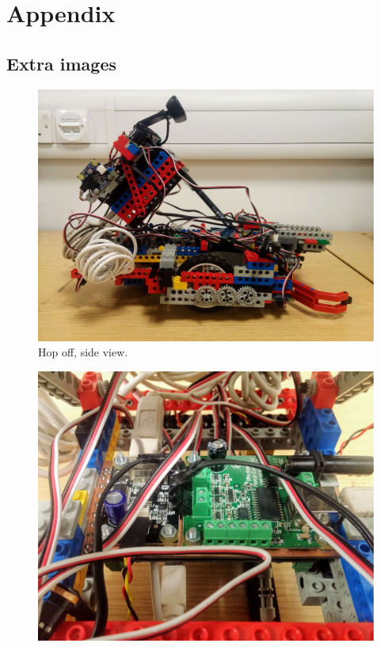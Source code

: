 \appendix

\section{Appendix}


\subsection{Extra images}

\begin{figure}[ht]
    \centering
    \includegraphics[width=0.7\linewidth]{res/robot-pics/top-off-side-view.jpg}
    \caption{Hop off, side view.}
    \label{fig:}
\end{figure}

\begin{figure}[ht]
    \centering
    \includegraphics[width=0.7\linewidth]{res/robot-pics/phidget-boards.jpg}
    \caption{}
    \label{fig:}
\end{figure}

